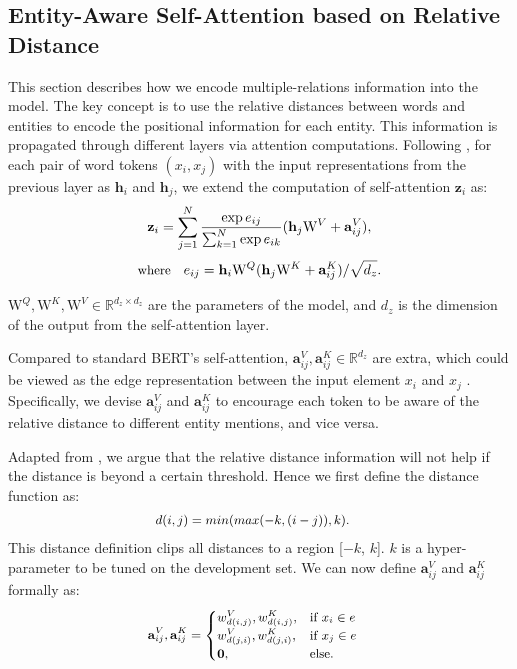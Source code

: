\documentclass[11pt,a4paper]{article}
\newcommand{\ba}{\mathbf{a}}
\newcommand{\bh}{\mathbf{h}}
\newcommand{\bz}{\mathbf{z}}
\newcommand{\rW}{\mathrm{W}}
\begin{document}
\subsection{Entity-Aware Self-Attention based on Relative Distance}
\label{ssec:attention}
This section describes how we encode multiple-relations information into the model.  The key concept is to use the relative distances between words and entities to encode the positional information for each entity.  This information is propagated through different layers via attention computations.  Following \cite{shaw2018self}, for each pair of word tokens $(x_i, x_j)$ with the input representations from the previous layer as $\bh_i$ and $\bh_j$,  we extend the computation of self-attention $\bz_i$ as:
\begin{equation}
\small
  \bz_i = \sum_{j=1}^N \frac{\exp e_{ij}}{\sum_{k=1}^N \exp e_{ik}} (\bh_j \rW^V + \ba_{ij}^V),
\label{value-entity}
\end{equation}
\begin{equation}
\small
 \text{where}\quad e_{ij} = \bh_i \rW^Q(\bh_j \rW^K + \ba^K_{ij})/\sqrt{d_z}.
\label{attention-entity}
\end{equation}

$\rW^Q, \rW^K, \rW^V \in \mathbb{R}^{d_z \times d_z}$ are the parameters of the model, and $d_z$ is the dimension of the output from the self-attention layer.  

Compared to standard BERT's self-attention, $\ba_{ij}^V, \ba_{ij}^K \in \mathbb{R}^{d_z}$ are extra, which could be viewed as the edge representation between the input element $x_i$ and $x_j$ . Specifically, we 
devise $\ba_{ij}^V$ and $\ba_{ij}^K$ 
to encourage each token to be aware of the relative distance to different entity mentions, and vice versa.

Adapted from \cite{shaw2018self}, we argue that the relative distance information will not help if the distance is beyond a certain threshold. Hence we first define the distance function as:
\begin{equation}
\small
\begin{aligned}
d(i,j) &= min(max(-k, (i - j)), k).
\label{eq:distance}
\end{aligned}
\end{equation}
This distance definition clips all distances to a region [$-k$, $k$].
$k$ is a hyper-parameter to be tuned on the development set. We can now define $\ba_{ij}^V$ and $\ba_{ij}^K$ formally as:
\begin{equation}
\small
\begin{aligned}
\ba_{ij}^V, \ba_{ij}^K &= 
\begin{cases}
w_{d(i,j)}^V, w_{d(i,j)}^K, & \text{if } x_i \in e \\
w_{d(j,i)}^V, w_{d(j,i)}^K, & \text{if } x_j \in e \\
\bf 0, & \text{else}.
\end{cases}
\end{aligned}
\end{equation}
\end{document}
